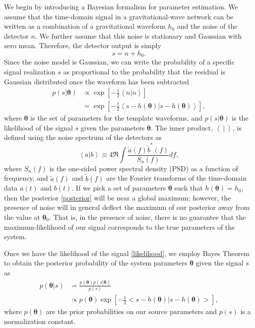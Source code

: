 \documentclass[11pt,a4paper]{emulateapj}
\newcommand{\thpara}{\boldsymbol{\theta}}
\begin{document}
We begin by introducing a Bayesian formalism for parameter estimation. 
We assume that the time-domain signal in a gravitational-wave
network can be written as a combination of a gravitational
waveform $h_0$ and the noise of the detector $n$.  We further assume
that this noise is stationary and Gaussian with zero mean.  Therefore,
the detector output is simply
\begin{equation}
s = n + h_0 .
\label{SignalAddition}
\end{equation}
Since the noise model is Gaussian, we can write the
probability of a specific signal realization $s$ as proportional to the probability
that the residual is Gaussian distributed once the waveform has been subtracted
\begin{align}
  p(s | \thpara) &\propto \exp\left[-\frac{1}{2}\left<n|n
    \right>\right] \nonumber \\ &= \exp\left[-\frac{1}{2}\left < s -
    h(\thpara) | s-h(\thpara)\right >\right] ,
  \label{likelihood}
\end{align}
where $\thpara$ is the set of parameters for the template
waveforms, and $p(s | \thpara)$ is the likelihood of the signal $s$ given the parameters $\thpara$.
  The inner product, $\left< ~|~ \right> $, is defined using the noise
spectrum of the detectors as
\begin{equation}
  \left<a|b\right> \equiv 4 \Re \int \frac{\tilde{a}(f)\tilde{b}^*(f)}{S_n(f)} df ,
  \label{innerProduct}
\end{equation}
where $S_n(f)$ is the one-sided power spectral density (PSD) as a function
of frequency, and $\tilde{a}(f)$ and $\tilde{b}(f)$ are the Fourier
transforms of the time-domain data $a(t)$ and $b(t)$.  If we pick a set of parameters $\thpara$ such that
$h(\thpara) = h_0$, then the posterior \eqref{posterior}
will be near a global maximum; however, the presence of noise will in
general deflect the maximum of our posterior away from the value at
$\thpara_0$. That is, in the presence of noise, there is
no guarantee that the maximum-likelihood of our signal corresponds to
the true parameters of the system. 
 
Once we have the likelihood of the signal \eqref{likelihood}, we
employ Bayes Theorem to obtain the posterior probability of the system
parameters $\thpara$ given the signal $s$ as
\begin{align}
  p(\thpara | s) &= \frac{p(\thpara)p(s | \thpara)}{p(s)} \nonumber\\
  & \propto p(\thpara) \exp\left[-\frac{1}{2}\big < s - h(\thpara) | s-h(\thpara) \big > \right] ,
  \label{posterior}
\end{align}
where $p(\thpara)$ are the prior probabilities on our
source parameters and $p(s)$ is a normalization constant.
\end{document}
